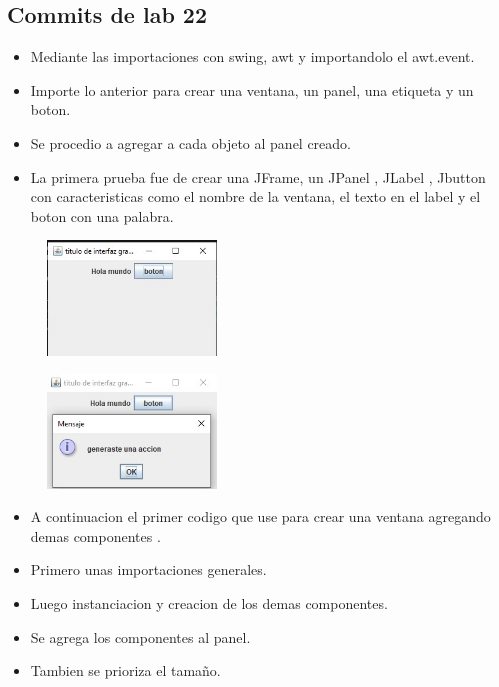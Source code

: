 \documentclass{article}
\begin{document}
	\subsection{Commits de lab 22}
\begin{itemize}		
		\item Mediante las importaciones con swing, awt y importandolo el awt.event.
		\item Importe lo anterior para crear una ventana, un panel, una etiqueta y un boton.
		\item Se procedio a agregar a cada objeto al panel creado.
		\item La primera prueba fue de crear una JFrame, un JPanel , JLabel , Jbutton con caracteristicas como el nombre de la ventana, el texto en el label y el boton con una palabra.
	\end{itemize}

	\begin{figure}[H]
		\centering
		\includegraphics[width=0.4\textwidth,keepaspectratio]{img/img_primer_uno}
	\end{figure}
	\begin{figure}[H]
		\centering
		\includegraphics[width=0.4\textwidth,keepaspectratio]{img/img_primer_dos}
	\end{figure}
\begin{itemize}		
		\item A continuacion el primer codigo que use para crear una ventana agregando demas componentes .
		\item Primero unas importaciones generales.
		\item Luego instanciacion y creacion de los demas componentes.
		\item Se agrega los componentes al panel.
		\item Tambien se prioriza el tamaño.
	\end{itemize}
	
	
\end{document}
